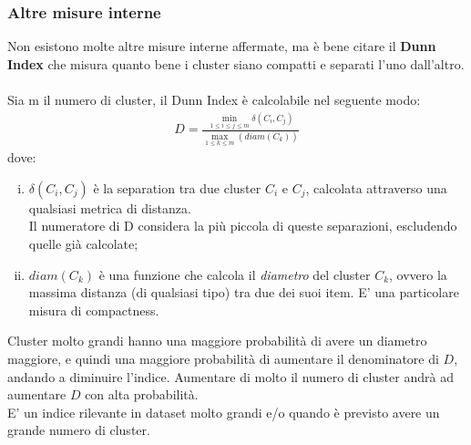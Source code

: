 \subsubsection{Altre misure interne}
Non esistono molte altre misure interne affermate, ma è bene citare il \textbf{Dunn Index} che misura quanto bene i cluster siano compatti e separati l'uno dall'altro.\\
\\
Sia m il numero di cluster, il Dunn Index è calcolabile nel seguente modo:
\begin{align}
D = \frac{\min_{1\le i \le j \le m}\delta(C_i, C_j)}{\max_{1 \le k \le m}(diam(C_k))}
\end{align}
dove:
\begin{enumerate}[(i)]
	\item $ \delta(C_i, C_j) $ è la separation tra due cluster $C_i$ e $C_j$, calcolata attraverso una qualsiasi metrica di distanza.\\
	Il numeratore di D considera la più piccola di queste separazioni, escludendo quelle già calcolate;
	\item $ diam(C_k) $ è una funzione che calcola il \textit{diametro} del cluster $C_k$, ovvero la massima distanza (di qualsiasi tipo) tra due dei suoi item. E' una particolare misura di compactness.
\end{enumerate}
Cluster molto grandi hanno una maggiore probabilità di avere un diametro maggiore, e quindi una maggiore probabilità di aumentare il denominatore di $D$, andando a diminuire l'indice. Aumentare di molto il numero di cluster andrà ad aumentare $D$ con alta probabilità.\\
E' un indice rilevante in dataset molto grandi e/o quando è previsto avere un grande numero di cluster.

